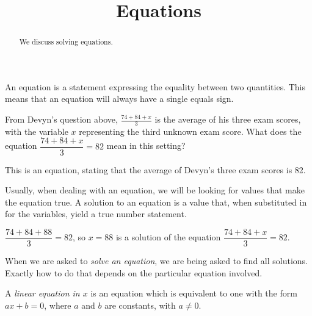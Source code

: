 \documentclass{ximera}
\title[Dig-In:]{Equations}
\begin{document}
\begin{abstract}
  We discuss solving equations.
\end{abstract}
\maketitle

An equation is a statement expressing the equality between two quantities.  This means that an equation will always have a single equals sign.


\begin{example}
  From Devyn's question above, $\displaystyle \frac{74 + 84 + x}{3}$ is the average of his three exam 
  scores, with the variable $x$ representing the third unknown exam score.  What does the equation
  $\displaystyle \dfrac{74 + 84 + x}{3} = 82$ mean in this setting?
  
  \begin{explanation}
    This is an equation, stating that the average of Devyn's three exam scores is 82.
  \end{explanation}
\end{example}

Usually, when dealing with an equation, we will be looking for values that make the equation true.
A solution to an equation is a value that, when substituted in for the variables, yield a true number statement.

\begin{example}
	$\displaystyle \dfrac{74 + 84 + 88}{3} = 82$, so $x = 88$ is a solution of the equation
	$\displaystyle \dfrac{74 + 84 + x}{3} = 82$.
\end{example}

When we are asked to \emph{solve an equation}, we are being asked to find all solutions.
Exactly how to do that depends on the particular equation involved.

A \emph{linear equation in $x$} is an equation which is equivalent to one with the form
$a x + b = 0$, where $a$ and $b$ are constants, with $a \neq 0$.
\end{document}
